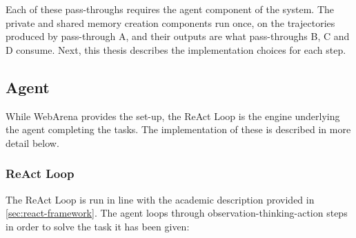 Each of these pass-throughs requires the agent component of the system. The private and shared memory creation components run once, on the trajectories produced by pass-through A, and their outputs are what pass-throughs B, C and D consume. Next, this thesis describes the implementation choices for each step.

\subsection{Agent}
While WebArena provides the set-up, the ReAct Loop is the engine underlying the agent completing the tasks. The implementation of these is described in more detail below.

\subsubsection{ReAct Loop}
The ReAct Loop is run in line with the academic description provided in
\ref{sec:react-framework}. The agent loops through observation-thinking-action steps in order to solve the task it has been given:
